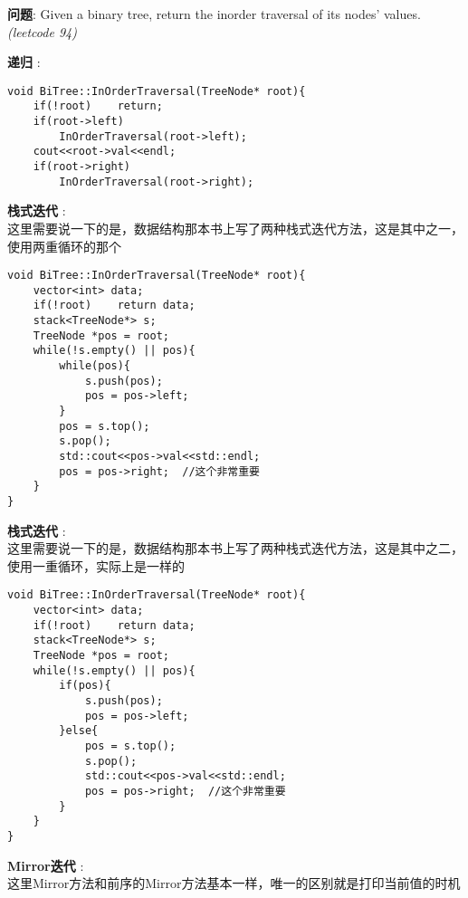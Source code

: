 \documentclass{article}
\begin{document}
\begin{CJK}{UTF8}{gbsn}     %

\else
    
\begin{description}
    \item{\textbf{问题}}: Given a binary tree, return the inorder traversal of its nodes' values. \textit{(leetcode 94)}
    \item{\textbf{递归}} : 
    \\
    \begin{lstlisting}
void BiTree::InOrderTraversal(TreeNode* root){
    if(!root)    return;
    if(root->left)
        InOrderTraversal(root->left);
    cout<<root->val<<endl;
    if(root->right)
        InOrderTraversal(root->right);
    \end{lstlisting}
    \item{\textbf{栈式迭代}} : 
    \\这里需要说一下的是，数据结构那本书上写了两种栈式迭代方法，这是其中之一，使用两重循环的那个
    \begin{lstlisting}
void BiTree::InOrderTraversal(TreeNode* root){
    vector<int> data;
    if(!root)    return data;
    stack<TreeNode*> s;
    TreeNode *pos = root;
    while(!s.empty() || pos){
        while(pos){
            s.push(pos);
            pos = pos->left;
        }
        pos = s.top();
        s.pop();
        std::cout<<pos->val<<std::endl;
        pos = pos->right;  //这个非常重要
    }
}
    \end{lstlisting}
    \item{\textbf{栈式迭代}} : 
    \\这里需要说一下的是，数据结构那本书上写了两种栈式迭代方法，这是其中之二，使用一重循环，实际上是一样的
    \begin{lstlisting}
void BiTree::InOrderTraversal(TreeNode* root){
    vector<int> data;
    if(!root)    return data;
    stack<TreeNode*> s;
    TreeNode *pos = root;
    while(!s.empty() || pos){
        if(pos){
            s.push(pos);
            pos = pos->left;
        }else{
            pos = s.top();
            s.pop();
            std::cout<<pos->val<<std::endl;
            pos = pos->right;  //这个非常重要
        }
    }
}
    \end{lstlisting}
    \item{\textbf{Mirror迭代}} : 
    \\这里Mirror方法和前序的Mirror方法基本一样，唯一的区别就是打印当前值的时机

\end{description}
\end{CJK}
\end{document}
